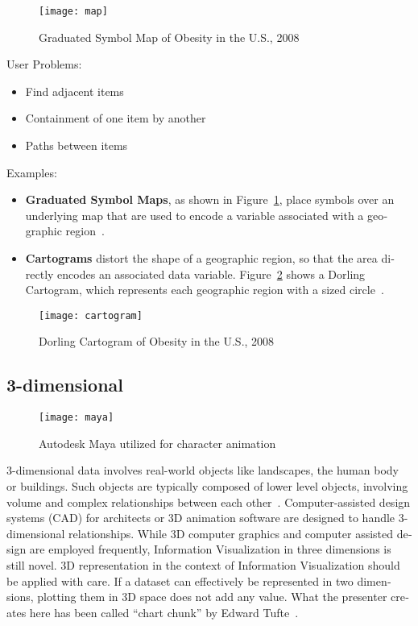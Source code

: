 \begin{english}
\begin{figure}
\centering
\texttt{[image: map]}
\caption{Graduated Symbol Map of Obesity in the U.S., 2008}
\label{fig:map}
\end{figure}

\SuperPar User Problems:

\begin{itemize}
\item Find adjacent items
\item Containment of one item by another
\item Paths between items
\end{itemize}

\SuperPar Examples:

\begin{itemize}
\item \textbf{Graduated Symbol Maps}, as shown in Figure~\ref{fig:map}, place symbols over an underlying map that are used to encode a variable associated with a geographic region~\cite{VisualizationZoo:2010}.
\item \textbf{Cartograms} distort the shape of a geographic region, so that the area directly encodes an associated data variable. Figure~\ref{fig:cartogram} shows a Dorling Cartogram, which represents each geographic region with a sized circle~\cite{VisualizationZoo:2010}.
\end{itemize}

\begin{figure}
\centering
\texttt{[image: cartogram]}
\caption{Dorling Cartogram of Obesity in the U.S., 2008}
\label{fig:cartogram}
\end{figure}



\subsection{3-dimensional}

\begin{figure}
\centering
\texttt{[image: maya]}
\caption{Autodesk Maya utilized for character animation}
\label{fig:maya}
\end{figure}

3-dimensional data involves real-world objects like landscapes, the human body or buildings. Such objects are typically composed of lower level objects, involving volume and complex relationships between each other~\cite{shneiderman96eyes}. Computer-assisted design systems (CAD) for architects or 3D animation software are designed to handle 3-dimensional relationships. While 3D computer graphics and computer assisted design are employed frequently, Information Visualization in three dimensions is still novel. 3D representation in the context of Information Visualization should be applied with care. If a dataset can effectively be represented in two dimensions, plotting them in 3D space does not add any value. What the presenter creates here has been called ``chart chunk'' by Edward Tufte~\cite{tufte09}.



\end{english}
